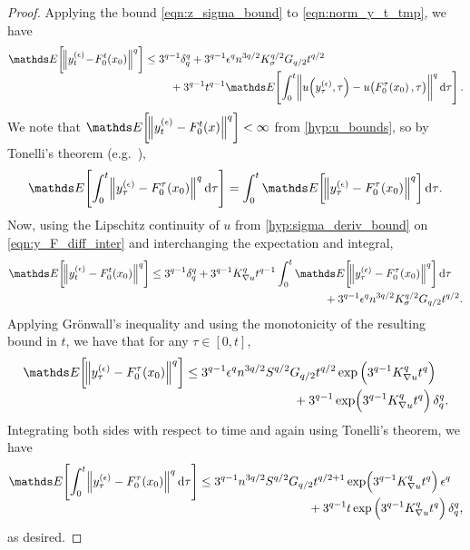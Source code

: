 \begin{proof}
	Applying the bound \cref{eqn:z_sigma_bound} to \cref{eqn:norm_y_t_tmp}, we have
	\begin{equation}\label{eqn:y_F_diff_inter}
		\avg{\norm{y_t^{(\epsilon)}\!-\!F_0^t\!\left(x_0\right)}^q} \leq \begin{multlined}[t]
			3^{q-1}\delta_q^q + 3^{q-1}\epsilon^q n^{3q/2}K_{\sigma}^{q/2} G_{q/2} t^{q/2} \\
			+ 3^{q-1}t^{q-1}\avg{\int_0^{t}{\norm{u\!\left(y_\tau^{(\epsilon)}, \tau\right) - u\!\left(F_0^{\tau}\!\left(x_0\right), \tau\right)}}^q\dif\tau}.
		\end{multlined}
	\end{equation}
	We note that \(\avg{\norm{y_t^{(\epsilon)} - F_0^t\!\left(x\right)}^q} < \infty\) from \ref{hyp:u_bounds}, so by Tonelli's theorem (e.g.\ \citet[Thm. 2.3.9]{Bremaud_2020_ProbabilityTheoryStochastic}),
	\begin{equation*}
		\avg{\int_0^{t}{\norm{y_\tau^{(\epsilon)} - F_0^\tau\!\left(x_0\right)}^q\dif\tau}} = \int_0^{t}{\avg{\norm{y_\tau^{(\epsilon)} - F_0^\tau\!\left(x_0\right)}^q}\dif\tau}.
		\label{eqn:y_tonelli}
	\end{equation*}
	Now, using the Lipschitz continuity of \(u \) from \ref{hyp:sigma_deriv_bound} on \cref{eqn:y_F_diff_inter} and interchanging the expectation and integral,
	\[
		\avg{\norm{y_t^{(\epsilon)} - F_0^t\!\left(x_0\right)}^q} \leq \begin{multlined}[t]
			3^{q-1}\delta_q^q + 3^{q-1} K_{\nabla u}^q t^{q-1} \int_0^{t}{\avg{\norm{y_\tau^{(\epsilon)} - F_0^{\tau}\!\left(x_0\right)}^q}\dif\tau} \\
			+ 3^{q-1}\epsilon^q n^{3q/2}K_{\sigma}^{q/2} G_{q/2} t^{q/2}.
		\end{multlined}
	\]
	Applying Gr\"{o}nwall's inequality and using the monotonicity of the resulting bound in \(t\), we have that for any \(\tau \in [0,t]\),
	\[
		\avg{\norm{y_\tau^{(\epsilon)} - F_0^\tau\!\left(x_0\right)}^q}  \leq \begin{multlined}[t]
			3^{q-1}\epsilon^q n^{3q/2}S^{q/2} G_{q/2} t^{q/2}\exp\left(3^{q-1} K_{\nabla u}^q t^q\right) \\
			+ 3^{q-1}\exp\!\left(3^{q-1} K_{\nabla u}^q t^q\right)\delta_q^q .
		\end{multlined}
	\]
	Integrating both sides with respect to time
	and again using Tonelli's theorem, we have
	\begin{align*}
		\avg{\int_0^t{\norm{y_\tau^{(\epsilon)} - F_0^\tau\!\left(x_0\right)}^q\dif\tau}} \leq \begin{multlined}[t]
			                                                                                       3^{q-1}n^{3q/2}S^{q/2} G_{q/2} t^{q/2 + 1}\exp\!\left(3^{q-1} K_{\nabla u}^q t^q\right)\epsilon^q  \\
			                                                                                       + 3^{q-1}t\exp\left(3^{q-1} K_{\nabla u}^q t^q\right)\delta_q^q ,
		                                                                                       \end{multlined}
	\end{align*}
	as desired.
\end{proof}

